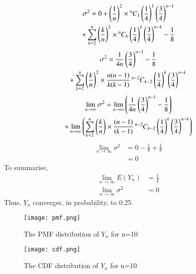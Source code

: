\documentclass[journal,12pt,twocolumn]{IEEEtran}
\begin{document}
\begin{multline}
    \sigma ^{2} = 0 + \brak{\frac{1}{n}}^2 \times  \comb[n]{1}\brak{\frac{1}{4}}^{1} \brak{\frac{3}{4}}^{n-1} 
    \\+ \sum_{k=2}^{n} \brak{\frac{k}{n}}^2 \times  \comb[n]{k}\brak{\frac{1}{4}}^{k} \brak{\frac{3}{4}}^{n-k} -\frac{1}{8}
\end{multline}
\begin{multline}
    \sigma ^{2} = \frac{1}{4n}\brak{\frac{3}{4}}^{n-1}-\frac{1}{8} 
    \\+ \sum_{k=2}^{n} \brak{\frac{k}{n}}^2 \times\frac{n(n-1)}{k(k-1)}  \comb[n-2]{k-2}\brak{\frac{1}{4}}^{k} \brak{\frac{3}{4}}^{n-k}
\end{multline}
\begin{multline}
    \lim_{n\rightarrow\infty}  \sigma ^{2} = \lim_{n\rightarrow\infty}\brak{ \frac{1}{4n}\brak{\frac{3}{4}}^{n-1}-\frac{1}{8}}
    \\+\lim_{n\rightarrow\infty}\brak{\sum_{k=2}^{n} \brak{\frac{k}{n}} \times\frac{(n-1)}{(k-1)}  \comb[n-2]{k-2}\brak{\frac{1}{4}}^{k} \brak{\frac{3}{4}}^{n-k}}
\end{multline}
\begin{align}
    \lim_{n\rightarrow\infty}  \sigma ^{2} &= 0 - \frac{1}{8} + \frac{1}{8}
    \\&= 0
\end{align}
To summarise,
\begin{align}
    \lim_{n\rightarrow \infty} E(Y_n) &= \frac{1}{4}
    \\\lim_{n\rightarrow\infty}  \sigma ^{2} &= 0
\end{align}
Thus, $Y_n$ converges, in probability, to 0.25. 
\begin{figure} [H]
    \texttt{[image: pmf.png]}
    \caption{The PMF distribution of $Y_n$ for n=10}
    \label{Fig 1}
\end{figure}
\begin{figure} [H]
    \texttt{[image: cdf.png]}
    \caption{The CDF distribution of $Y_n$ for n=10}
    \label{Fig 2}
\end{figure}
\end{document}
